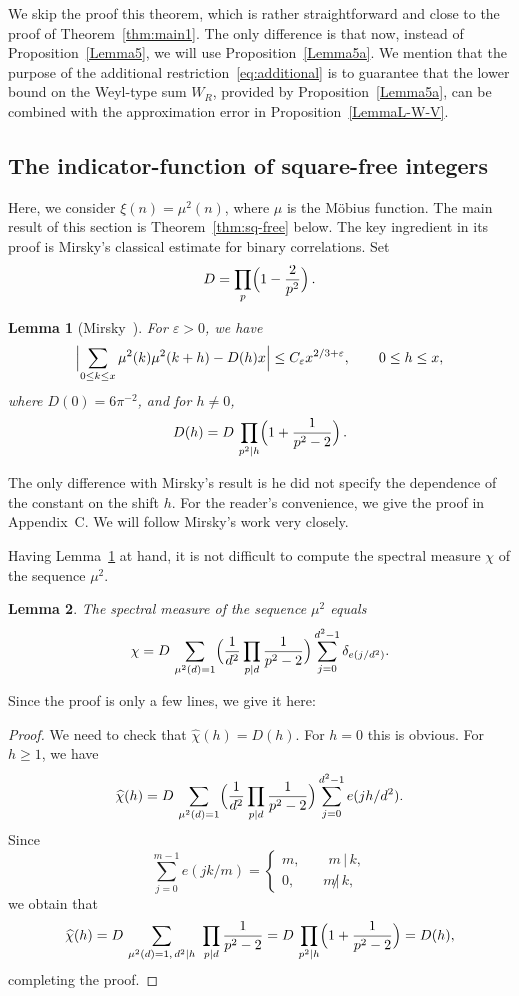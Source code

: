 \documentclass[11pt]{amsart}
\numberwithin{equation}{section}
\newtheorem{lemma}{Lemma}[section]
\begin{document}
We skip the proof this theorem, which is rather straightforward and close to the proof
of Theorem~\ref{thm:main1}. The only difference is that now, instead of Proposition~\ref{Lemma5},
we will use Proposition~\ref{Lemma5a}. We mention that the purpose of the additional
restriction~\eqref{eq:additional} is to guarantee that the lower bound on the Weyl-type sum
$W_R$, provided by Proposition~\ref{Lemma5a}, can be combined with the approximation error in Proposition~\ref{LemmaL-W-V}.


\subsection{The indicator-function of square-free integers}

Here, we consider $\xi (n) = \mu^2(n)$, where $\mu$ is the M\"obius function.
The main result of this section is Theorem~\ref{thm:sq-free} below.
The key ingredient in its proof is Mirsky's classical estimate for binary correlations.
Set
\[
D = \prod_p \Bigl( 1 - \frac2{p^2} \Bigr)\,.
\]

\begin{lemma}[Mirsky~\cite{Mirsky}]\label{Lemma:sq-free}
For $\varepsilon>0$, we have
$$
\Bigl|\sum_{0\le k \le x} \mu^2(k) \mu^2(k+h) - D(h) x\Bigr| \le C_\varepsilon x^{2/3+\varepsilon},\qquad 0\le h\le x,
$$
where $D(0)=6\pi^{-2}$, and for $h\ne 0$,
$$
D(h) = D\, \prod_{p^2 | h} \Bigl(1+\frac1{p^2-2} \Bigr)\,.
$$
\end{lemma}

The only difference with Mirsky's result is he did not specify the dependence of
the constant on the shift $h$. For the reader's convenience, we give the
proof in Appendix~C. We will follow Mirsky's work very closely.

Having Lemma~\ref{Lemma:sq-free} at hand, it is not difficult to compute the spectral measure $\chi$
of the sequence $\mu^2$.

\begin{lemma}\label{lemma:sq-free-spectral1}
The spectral measure of the sequence $\mu^2$ equals
$$
\chi=D\,\sum_{\mu^2(d)=1}\Bigl(\frac1{d^2}\prod_{p | d} \frac1{p^2-2} \Bigr)\sum_{j=0}^{d^2-1}\delta_{e(j/d^2)}.
$$
\end{lemma}

\noindent Since the proof is only a few lines, we give it here:

\begin{proof}
We need to check that $\widehat{\chi}(h)=D(h)$. For $h=0$ this is obvious. For $h\ge 1$, we have
$$
\widehat{\chi}(h)=D\, \sum_{\mu^2(d)=1}\Bigl(\frac1{d^2}\prod_{p | d} \frac1{p^2-2} \Bigr)\sum_{j=0}^{d^2-1}e(jh/d^2).
$$
Since
$$
\sum_{j=0}^{m-1}e(jk/m)=\begin{cases}
m,\qquad m\,|\,k,\\
0, \qquad m{\not|}\,k,
\end{cases}
$$
we obtain that
$$
\widehat{\chi}(h)=D\,
\sum_{\mu^2(d)=1,\,d^2|h}\ \prod_{p | d} \frac1{p^2-2} =
D\, \prod_{p^2|h} \Bigl(1+\frac1{p^2-2} \Bigr) = D(h),
$$
completing the proof. 
\end{proof}
\end{document}
